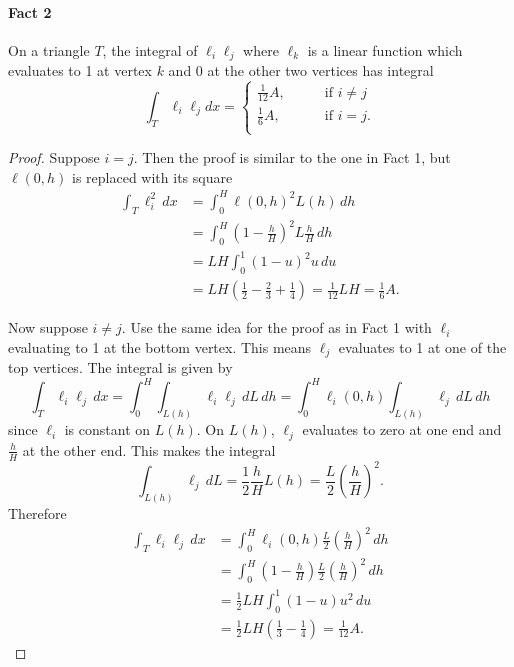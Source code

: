 \documentclass[12pt,letterpaper]{article}
\begin{document}
\paragraph{Fact 2}
On a triangle $T$, the integral of $\ell_i \ell_j$ where $\ell_k$ is a linear function which evaluates to 1 at vertex $k$ and 0 at the other two vertices has integral
\begin{equation}
\int_T \ell_i \ell_j dx = \begin{cases}
\frac{1}{12} A, \qquad &\textrm{if } i \neq j \\
\frac{1}{6} A, \qquad &\textrm{if } i = j. \\
\end{cases}
\end{equation}
\begin{proof}
Suppose $i = j$.
Then the proof is similar to the one in Fact 1, but $\ell(0,h)$ is replaced with its square
\begin{align*}
\int_T \ell_i^2 \, dx &= \int_0^H \ell(0,h)^2 L(h) \, dh \\
&= \int_0^H \left(1 - \frac{h}{H} \right)^2 L \frac{h}{H} \, dh \\
&= L H \int_0^1 (1 - u)^2 u \, du \\
&= L H \left( \frac{1}{2} - \frac{2}{3} + \frac{1}{4} \right) = \frac{1}{12} L H = \frac{1}{6} A.
\end{align*}

Now suppose $i \neq j$.
Use the same idea for the proof as in Fact 1 with $\ell_i$ evaluating to 1 at the bottom vertex.
This means $\ell_j$ evaluates to 1 at one of the top vertices.
The integral is given by
\begin{equation}
\int_T \ell_i \ell_j \, dx 
= \int_0^H \int_{L(h)} \ell_i \ell_j \, dL \, dh 
= \int_0^H \ell_i(0,h) \int_{L(h)} \ell_j \, dL \, dh
\end{equation}
since $\ell_i$ is constant on $L(h)$.
On $L(h)$, $\ell_j$ evaluates to zero at one end and $\frac{h}{H}$ at the other end.
This makes the integral
\begin{equation}
\int_{L(h)} \ell_j \, dL = \frac{1}{2} \frac{h}{H} L(h) = \frac{L}{2} \left( \frac{h}{H} \right)^2.
\end{equation}
Therefore
\begin{align}
\int_T \ell_i \ell_j \, dx 
&= \int_0^H \ell_i(0,h) \frac{L}{2} \left( \frac{h}{H} \right)^2 \, dh \\
&= \int_0^H \left(1 - \frac{h}{H} \right) \frac{L}{2} \left( \frac{h}{H} \right)^2 \, dh \\
&= \frac{1}{2} LH \int_0^1 \left(1 - u \right) u^2 \, du \\
&= \frac{1}{2} LH \left( \frac{1}{3} - \frac{1}{4} \right) = \frac{1}{12} A.
\end{align}
\end{proof}
\end{document}
